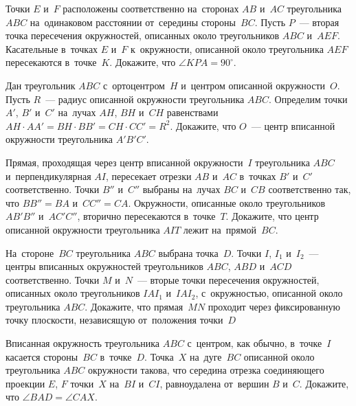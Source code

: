 


\begin{problems}

\item
Точки $E$ и~$F$ расположены соответственно на~сторонах $AB$ и~$AC$
треугольника $ABC$ на~одинаковом расстоянии от~середины стороны~$BC$.
Пусть $P$~--- вторая точка пересечения окружностей, описанных около
треугольников $ABC$ и~$AEF$.
Касательные в~точках $E$ и~$F$ к~окружности, описанной около треугольника $AEF$
пересекаются в~точке~$K$.
Докажите, что $\angle KPA = 90^{\circ}$.

\item
Дан треугольник $ABC$ с~ортоцентром~$H$ и~центром описанной окружности~$O$.
Пусть $R$~--- радиус описанной окружности треугольника $ABC$.
Определим точки $A'$, $B'$ и~$C'$ на~лучах $AH$, $BH$ и~$CH$ равенствами
$AH \cdot AA' = BH \cdot BB' = CH \cdot CC' = R^2$.
Докажите, что $O$~--- центр вписанной окружности треугольника $A'B'C'$.

\item
Прямая, проходящая через центр вписанной окружности~$I$ треугольника $ABC$
и~перпендикулярная $AI$, пересекает отрезки $AB$ и~$AC$ в~точках $B'$ и~$C'$
соответственно.
Точки $B''$ и~$C''$ выбраны на~лучах $BC$ и~$CB$ соответственно так, что
$BB'' = BA$ и~$CC'' = CA$.
Окружности, описанные около треугольников $AB'B''$ и~$AC'C''$, вторично
пересекаются в~точке~$T$.
Докажите, что центр описанной окружности треугольника $AIT$ лежит
на~прямой~$BC$.

\item
На~стороне~$BC$ треугольника $ABC$ выбрана точка~$D$.
Точки $I$, $I_{1}$ и~$I_{2}$~--- центры вписанных окружностей
треугольников $ABC$, $ABD$ и~$ACD$ соответственно.
Точки $M$ и~$N$~--- вторые точки пересечения окружностей, описанных около
треугольников $IAI_{1}$ и~$IAI_{2}$, с~окружностью, описанной около
треугольника $ABC$.
Докажите, что прямая~$MN$ проходит через фиксированную точку плоскости,
независящую от~положения точки~$D$

\item
Вписанная окружность треугольника $ABC$ с~центром, как обычно, в~точке~$I$
касается стороны~$BC$ в~точке~$D$.
Точка~$X$ на~дуге~$BC$ описанной около треугольника $ABC$ окружности такова,
что середина отрезка соединяющего проекции $E$, $F$ точки~$X$ на~$BI$ и~$CI$,
равноудалена от~вершин $B$ и~$C$.
Докажите, что $\angle BAD = \angle CAX$.


\end{problems}
